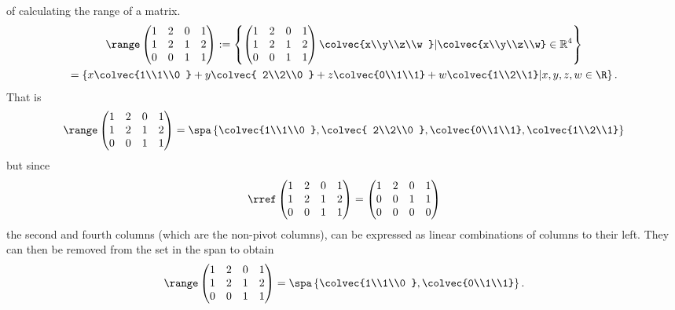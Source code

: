 \begin{example}{ of calculating the range of a matrix.}
\begin{gather*}\range  
\begin{pmatrix} 
1&2&0&1\\
1&2&1&2\\
0&0&1&1
\end{pmatrix} 
:= 
\left\{ 
\begin{pmatrix} 
1&2&0&1\\
1&2&1&2\\
0&0&1&1
\end{pmatrix} 
\colvec{x\\y\\z\\w } | \colvec{x\\y\\z\\w} \in \mathbb{R}^4 \right\}
\\=
\left\{   
x\colvec{1\\1\\0 } +y \colvec{ 2\\2\\0 } +z \colvec{0\\1\\1} + w\colvec{1\\2\\1} \middle| x,y,z,w \in \R \right\}
.\end{gather*}
That is 
\[
\range  
\begin{pmatrix} 
1&2&0&1\\
1&2&1&2\\
0&0&1&1
\end{pmatrix} 
= 
\spa \left\{   
\colvec{1\\1\\0 } , \colvec{ 2\\2\\0 } , \colvec{0\\1\\1}, \colvec{1\\2\\1} \right\}
\]
but since 
\[\rref\begin{pmatrix} 
1&2&0&1\\
1&2&1&2\\
0&0&1&1
\end{pmatrix} 
=\begin{pmatrix} 
1&2&0&1\\
0&0&1&1\\
0&0&0&0
\end{pmatrix} 
\]
the second and fourth columns (which are the non-pivot columns), can be expressed as linear combinations of columns to their left. 
They can then be removed from the set in the span to obtain
\[\range  
\begin{pmatrix} 
1&2&0&1\\
1&2&1&2\\
0&0&1&1
\end{pmatrix} 
= \spa \left\{   
\colvec{1\\1\\0 } , \colvec{0\\1\\1} \right\} .
\]
\end{example}


